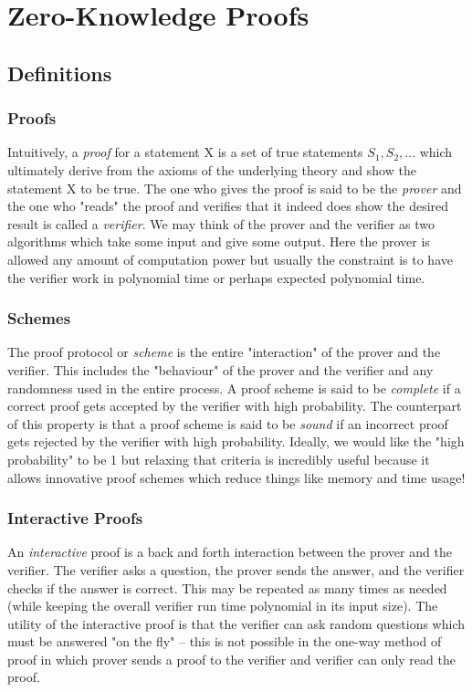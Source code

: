 \chapter{Zero-Knowledge Proofs}

\section{Definitions}

\subsection*{Proofs}
Intuitively, a \emph{proof} for a statement X is a set of true statements $S_1,S_2,\dots$ which ultimately derive 
from the axioms of the underlying theory and show the statement X to be true. The one who gives the proof 
is said to be the \emph{prover} and the one who "reads" the proof and verifies that it indeed does show the 
desired result is called a \emph{verifier}. We may think of the prover and the verifier as two algorithms 
which take some input and give some output. Here the prover is allowed any amount of computation power but 
usually the constraint is to have the verifier work in polynomial time or perhaps expected polynomial time. \\

\subsection*{Schemes}
\noindent The proof protocol or \emph{scheme} is the entire "interaction" of the prover and the verifier. This 
includes the "behaviour" of the prover and the verifier and any randomness used in the entire process. 
A proof scheme is said to be \emph{complete} if a correct proof gets accepted by the verifier with high 
probability. The counterpart of this property is that a proof scheme is said to be \emph{sound} if an 
incorrect proof gets rejected by the verifier with high probability. Ideally, we would 
like the "high probability" to be 1 but relaxing that criteria is incredibly useful because it 
allows innovative proof schemes which reduce things like memory and time usage!\\

\subsection*{Interactive Proofs}
\noindent An \emph{interactive} proof is a back and forth interaction between the prover and the 
verifier. The verifier asks a question, the prover sends the answer, and the verifier checks if 
the answer is correct. This may be repeated as many times as needed (while keeping the overall verifier run 
time polynomial in its input size). The utility of the interactive proof is that the verifier can ask 
random questions which must be answered "on the fly" -- this is not possible in the one-way method 
of proof in which prover sends a proof to the verifier and verifier can only read the proof. \\

